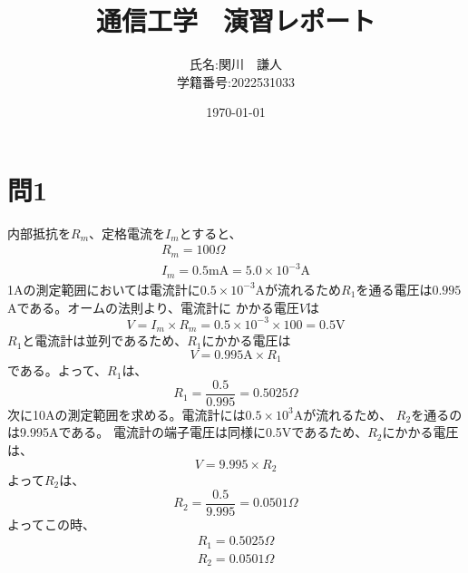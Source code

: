 \documentclass[a4paper,11pt]{ltjsarticle}
\begin{document}
\title{通信工学　演習レポート}
\author{氏名:関川　謙人\\学籍番号:2022531033}
\date{\today}
\maketitle

\section*{問1}
内部抵抗を$R_{m}$、定格電流を$I_{m}$とすると、
\begin{gather*}
  R_{m} = 100 \Omega \\
  I_{m} = 0.5\mathrm{mA} = 5.0 \times 10^{-3} \mathrm{A}
\end{gather*}
1Aの測定範囲においては電流計に$0.5 \times 10^{-3}$Aが流れるため$R_{1}$を通る電圧は$ 0.995$Aである。オームの法則より、電流計に
かかる電圧$V$は
\begin{equation*}
  V = I_{m} \times R_{m} = 0.5 \times 10^{-3} \times 100 = 0.5 \mathrm{V}
\end{equation*}
$R_{1}$と電流計は並列であるため、$R_{1}$にかかる電圧は
\begin{equation*}
  V = 0.995 \mathrm{A} \times R_{1} 
\end{equation*}
である。よって、$R_{1}$は、
\begin{equation*}
  R_{1} = \frac{0.5}{0.995} = 0.5025 \Omega
\end{equation*}
次に10Aの測定範囲を求める。電流計には$0.5 \times 10^{3}$Aが流れるため、
$R_{2}$を通るのは9.995Aである。
電流計の端子電圧は同様に0.5Vであるため、$R_{2}$にかかる電圧は、
\begin{equation*}
  V = 9.995 \times R_{2}
\end{equation*}
よって$R_{2}$は、
\begin{equation*}
  R_{2} = \frac{0.5}{9.995} = 0.0501 \Omega
\end{equation*}
よってこの時、
\begin{gather*}
  R_{1} = 0.5025 \Omega \\
  R_{2} = 0.0501 \Omega
\end{gather*}
\end{document}
